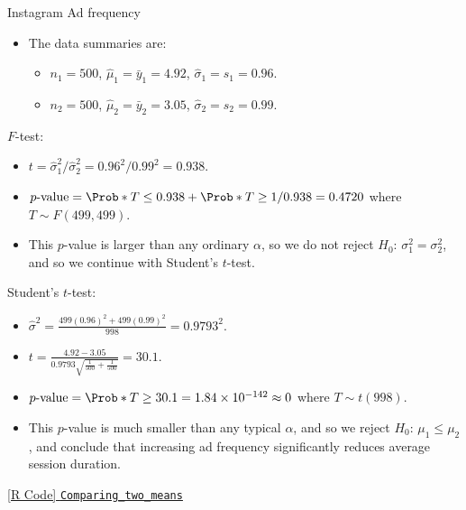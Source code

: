 \begin{Example}{Instagram Ad frequency}{}
\begin{itemize}
                  \centerline{$ H_0 $: $ \mu_1\le \mu_2 $ versus $ H_\text{A} $: $ \mu_1>\mu_2 $}
            \item The data summaries are:
                  \begin{itemize}
                        \item $ n_1=500 $, $ \hat{\mu}_1=\bar{y}_1=4.92 $, $ \hat{\sigma}_1=s_1=0.96 $.
                        \item $ n_2=500 $, $ \hat{\mu}_2=\bar{y}_2=3.05 $, $ \hat{\sigma}_2=s_2=0.99 $.
                  \end{itemize}
      \end{itemize}
      \begin{framed}
            $ F $-test:
            \begin{itemize}
                  \item $ t=\hat{\sigma}_1^2/\hat{\sigma}_2^2=0.96^2/0.99^2=0.938 $.
                  \item $ p\text{-value}=\Prob*{T\le 0.938}+\Prob*{T\ge 1/0.938}=0.4720 $
                        where $ T \sim F(499,499) $.
                  \item This $ p $-value is larger than any ordinary $ \alpha $, so
                        we do not reject $ H_0 $: $ \sigma_1^2=\sigma_2^2 $, and so we continue
                        with Student's $ t $-test.
            \end{itemize}
      \end{framed}
      \begin{framed}
            Student's $ t $-test:
            \begin{itemize}
                  \item $ \displaystyle \hat{\sigma}^2=\frac{499(0.96)^2+499(0.99)^2}{998}=0.9793^2 $.
                  \item $ \displaystyle t=\frac{4.92-3.05}{0.9793\sqrt{\frac{1}{500} +\frac{1}{500} }}=30.1  $.
                  \item $ p\text{-value}=\Prob*{T\ge 30.1}=1.84\times 10^{-142}\approx 0 $ where $ T \sim t(998) $.
                  \item This $ p $-value is much smaller than any typical $ \alpha $, and so we reject
                        $ H_0 $: $ \mu_1\le \mu_2 $, and conclude that increasing ad frequency significantly
                        reduces average session duration.
            \end{itemize}
      \end{framed}
      \href{https://github.com/Hextical/university-notes/blob/master/year-3/semester-3/STAT%20430/code/2.2%20-%20Comparing_two_means.R}{[R Code] \texttt{Comparing\_two\_means}}
\end{Example}
